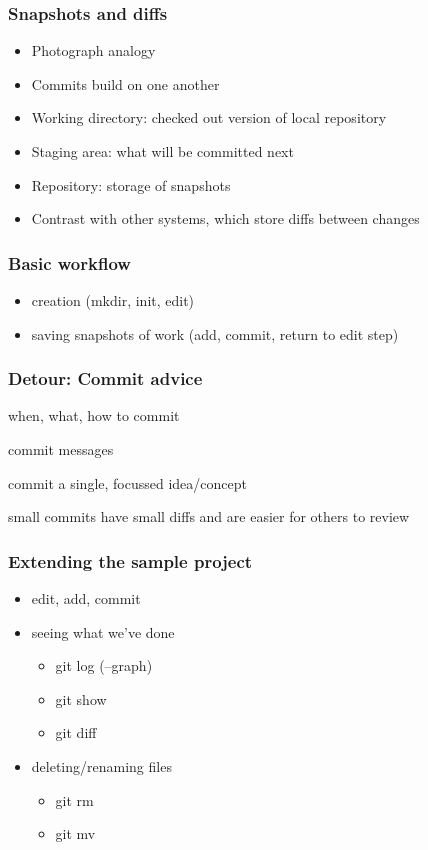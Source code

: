 \documentclass{git_course}
\begin{document}
\begin{frame}
\frametitle{Snapshots and diffs}
\begin{itemize}
    \item Photograph analogy
    \item Commits build on one another
    \item Working directory: checked out version of local repository
    \item Staging area: what will be committed next
    \item Repository: storage of snapshots
    \item Contrast with other systems, which store diffs between changes
\end{itemize}
\end{frame}

\begin{frame}
\frametitle{Basic workflow}
\begin{itemize}
    \item creation (mkdir, init, edit)
    \item saving snapshots of work (add, commit, return to edit step)
\end{itemize}
\end{frame}

\begin{frame}
\frametitle{Detour: Commit advice}

when, what, how to commit

commit messages

commit a single, focussed idea/concept

small commits have small diffs and are easier for others to review
\end{frame}

\begin{frame}
\frametitle{Extending the sample project}
\begin{itemize}
    \item edit, add, commit
    \item seeing what we've done
    \begin{itemize}
        \item git log (--graph)
        \item git show
        \item git diff
    \end{itemize}
    \item deleting/renaming files
    \begin{itemize}
        \item git rm
        \item git mv
    \end{itemize}
\end{itemize}
\end{frame}
\end{document}

